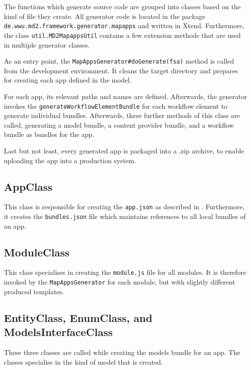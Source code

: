 
The functions which generate \mapapps source code are grouped into classes based on the kind of file they create. All \mapapps generator code is located in the package \lstinline[language=Simple]|de.wwu.md2.framework.generator.mapapps| and written in Xtend. Furthermore, the class \lstinline|util.MD2MapappsUtil| contains a few extension methods that are used in multiple generator classes.

As an entry point, the \lstinline[language=Simple]|MapAppsGenerator#doGenerate(fsa)| method is called from the development environment. It cleans the target directory and prepares for creating  each app defined in the model.

For each app, its relevant paths and names are defined. Afterwards, the generator invokes the \lstinline|generateWorkflowElementBundle| for each workflow element to generate individual bundles. Afterwards, three further methods of this class are called, generating a model bundle, a content provider bundle, and a workflow bundle as bundles for the app.


Last but not least, every generated app is packaged into a .zip archive, to enable uploading the app into a production \mapapps system.

\subsection{AppClass}

This class is responsible for creating the \lstinline[language=Simple]|app.json| as described in . Furthermore, it creates the \lstinline[language=Simple]|bundles.json| file which maintains references to all local bundles of an app.

\subsection{ModuleClass}

This class specialises in creating the \lstinline|module.js| file for all modules. It is therefore invoked by the \lstinline|MapAppsGenerator| for each module, but with slightly different produced templates.

\subsection{EntityClass, EnumClass, and ModelsInterfaceClass}
These three classes are called while creating the models bundle for an app. 
The classes specialise in the kind of model that is created.

